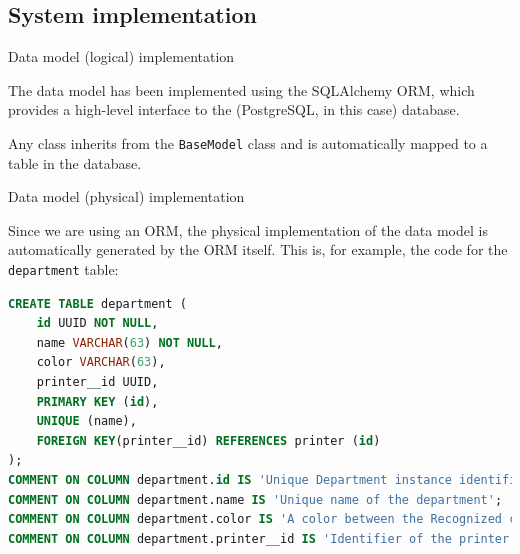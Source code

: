 \subsection{System implementation}

\begin{frame}[allowframebreaks]{Data model (logical) implementation}

	The data model has been implemented using the SQLAlchemy ORM, which
	provides a high-level interface to the (PostgreSQL, in this case) database.

	

	Any class inherits from the \texttt{BaseModel} class and is automatically
	mapped to a table in the database.

	\framebreak

	\vspace*{-1\baselineskip}
	

\end{frame}

\begin{frame}[fragile]{Data model (physical) implementation}

	Since we are using an ORM, the physical implementation of the data model is
	automatically generated by the ORM itself.
	This is, for example, the code for the \texttt{department} table:

	\begin{lstlisting}[language=SQL]
CREATE TABLE department (
	id UUID NOT NULL,
	name VARCHAR(63) NOT NULL,
	color VARCHAR(63),
	printer__id UUID,
	PRIMARY KEY (id),
	UNIQUE (name),
	FOREIGN KEY(printer__id) REFERENCES printer (id)
);
COMMENT ON COLUMN department.id IS 'Unique Department instance identifier';
COMMENT ON COLUMN department.name IS 'Unique name of the department';
COMMENT ON COLUMN department.color IS 'A color between the Recognized color keyword names. See also https://www.w3.org/TR/SVG11/types.html#ColorKeywords';
COMMENT ON COLUMN department.printer__id IS 'Identifier of the printer the department is equipped with';\end{lstlisting}

\end{frame}

